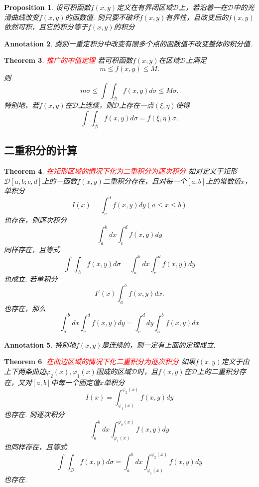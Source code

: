 \documentclass{article}
\newtheorem{theorem}{Theorem}[section]
\newtheorem{proposition}[theorem]{Proposition}
\newtheorem{annotation}[theorem]{Annotation}
\newcommand{\redt}[1]{\textcolor{red}{#1}}
\begin{document}
\begin{proposition}
\rm 设可积函数$f(x,y)$定义在有界闭区域$\mathcal{D}$上，若沿着一在$\mathcal{D}$中的光滑曲线改变$f(x,y)$的函数值. 则只要不破坏$f(x,y)$有界性，且改变后的$f(x,y)$依然可积，且它的积分等于$f(x,y)$的积分
\end{proposition}

\begin{annotation}
\rm 类别一重定积分中改变有限多个点的函数值不改变整体的积分值.
\end{annotation}

\begin{theorem}
\rm \redt{推广的中值定理} 若可积函数$f(x,y)$在区域$\mathcal{D}$上满足
$$
m \leq f(x,y) \leq M.
$$
则
$$
m\sigma \leq \int\int_{\mathcal{D}}f(x,y)d\sigma \leq M\sigma.
$$
特别地，若$f(x,y)$在$\mathcal{D}$上连续，则$\mathcal{D}$上存在一点$(\xi,\eta)$使得
$$
\int\int_{\mathcal{D}}f(x,y)d\sigma = f(\xi,\eta)\sigma.
$$
\end{theorem}

\subsection{二重积分的计算}

\begin{theorem}
\rm \redt{在矩形区域的情况下化为二重积分为逐次积分} 如对定义于矩形$\mathcal{D}[a,b;c,d]$上的一函数$f(x,y)$二重积分存在，且对每一个$[a,b]$上的常数值$x$，单积分
$$
I(x) = \int_c^d f(x,y)dy (a \leq x \leq b)
$$
也存在，则逐次积分
$$
\int_a^b dx \int_c^d f(x,y)dy
$$
同样存在，且等式
$$
\int\int_{\mathcal{D}}f(x,y)d\sigma = \int_a^b dx \int_c^d f(x,y)dy
$$
也成立. 若单积分
$$
I'(x)\int_a^b f(x,y)dx.
$$
也存在，那么
$$
\int_a^b dx \int_c^d f(x,y)dy = \int_c^d dy \int_a^b f(x,y)dx
$$
\end{theorem}

\begin{annotation}
\rm 特别地$f(x,y)$是连续的，则一定有上面的定理成立.
\end{annotation}

\begin{theorem}
\rm \redt{在曲边区域的情况下化二重积分为逐次积分} 如果$f(x,y)$定义于由上下两条曲边$\varphi_2(x),\varphi_1(x)$围成的区域$\mathcal{D}$时，且$f(x,y)$在$\mathcal{D}$上的二重积分存在，又对$[a,b]$中每一个固定值$x$单积分
$$
I(x) = \int_{\varphi_1(x)}^{\varphi_2(x)} f(x,y)dy
$$ 
也存在. 则逐次积分
$$
\int_a^b dx \int_{\varphi_1(x)}^{\varphi_2(x)} f(x,y)dy
$$
也同样存在，且等式
$$
\int\int_{\mathcal{D}}f(x,y)d\sigma = \int_a^b dx \int_{\varphi_1(x)}^{\varphi_2(x)} f(x,y)dy
$$
也存在. 
\end{theorem}
\end{document}
